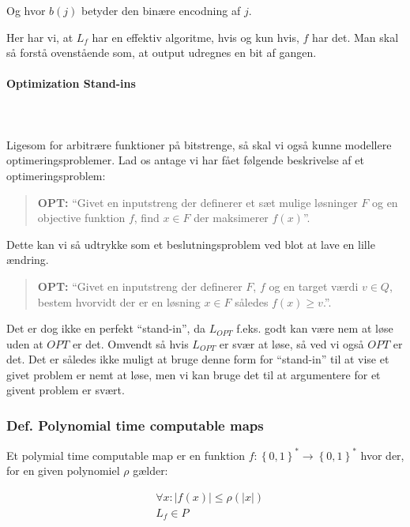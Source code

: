 Og hvor $b(j)$ betyder den binære encodning af $j$. 

Her har vi, at $L_f$ har en effektiv algoritme, hvis og kun hvis, $f$ har det. Man skal så forstå ovenstående som, at output udregnes en bit af gangen.

\paragraph{Optimization Stand-ins}
~\\
~\\
Ligesom for arbitrære funktioner på bitstrenge, så skal vi også kunne modellere optimeringsproblemer. Lad os antage vi har fået følgende beskrivelse af et optimeringsproblem:

\begin{quotation}
 \textbf{OPT:} ``Givet en inputstreng der definerer et sæt mulige løsninger $F$ og en objective funktion $f$, find $x \in F$ der maksimerer $f(x)$''.
\end{quotation}

Dette kan vi så udtrykke som et beslutningsproblem ved blot at lave en lille ændring.

\begin{quotation}
 \textbf{OPT:} ``Givet en inputstreng der definerer $F$, $f$ og en target værdi $v \in Q$, bestem hvorvidt der er en løsning $x \in F$ således $f(x) \geq v$.''.
\end{quotation}

Det er dog ikke en perfekt ``stand-in'', da $L_{OPT}$ f.eks. godt kan være nem at løse uden at $OPT$ er det. Omvendt så hvis $L_{OPT}$ er svær at løse, så ved vi også $OPT$ er det. Det er således ikke muligt at bruge denne form for ``stand-in'' til at vise et givet problem er nemt at løse, men vi kan bruge det til at argumentere for et givent problem er svært.



\subsubsection{Def. Polynomial time computable maps}

Et polymial time computable map er en funktion $f: \left\lbrace 0,1 \right\rbrace^* \rightarrow \left\lbrace 0,1 \right\rbrace^*$ hvor der, for en given polynomiel $\rho$ gælder:

\begin{align*}
 &\forall x: |f(x)| \leq \rho(|x|) \\
 &L_f	 \in P
\end{align*}

